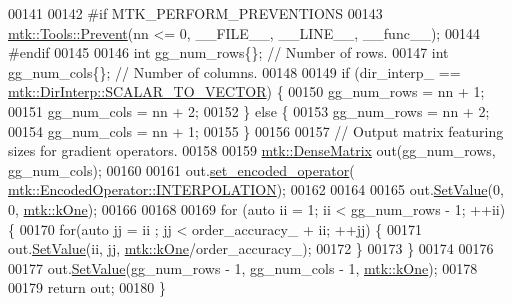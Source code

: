 \begin{DoxyCode}
00141 
00142 \textcolor{preprocessor}{  #if MTK\_PERFORM\_PREVENTIONS}
00143   \hyperlink{classmtk_1_1Tools_a332324c6f25e66be9dff48c5987a3b9f}{mtk::Tools::Prevent}(nn <= 0, \_\_FILE\_\_, \_\_LINE\_\_, \_\_func\_\_);
00144 \textcolor{preprocessor}{  #endif}
00145 
00146   \textcolor{keywordtype}{int} gg\_num\_rows\{\};  \textcolor{comment}{// Number of rows.}
00147   \textcolor{keywordtype}{int} gg\_num\_cols\{\};  \textcolor{comment}{// Number of columns.}
00148 
00149   \textcolor{keywordflow}{if} (dir\_interp\_ == \hyperlink{namespacemtk_ga674ec67bd1baa04e5dc06c2bcc351972a53facfbeb6725b2bd220c8d9811a0673}{mtk::DirInterp::SCALAR\_TO\_VECTOR}) \{
00150     gg\_num\_rows = nn + 1;
00151     gg\_num\_cols = nn + 2;
00152   \} \textcolor{keywordflow}{else} \{
00153     gg\_num\_rows = nn + 2;
00154     gg\_num\_cols = nn + 1;
00155   \}
00156 
00157   \textcolor{comment}{// Output matrix featuring sizes for gradient operators.}
00158 
00159   \hyperlink{classmtk_1_1DenseMatrix}{mtk::DenseMatrix} out(gg\_num\_rows, gg\_num\_cols);
00160 
00161   out.\hyperlink{classmtk_1_1DenseMatrix_ac0f824b0fec88c4fb42e77b7550fb0d3}{set\_encoded\_operator}(
      \hyperlink{namespacemtk_ga9b50023bfb2692219d2915feade94f80a6a9b19b26cdeae14c1102cd40345d568}{mtk::EncodedOperator::INTERPOLATION});
00162 
00164 
00165   out.\hyperlink{classmtk_1_1DenseMatrix_a784ce5784109ac86bfb9d8562b334b13}{SetValue}(0, 0, \hyperlink{group__c01-roots_ga26407c24d43b6b95480943340d285c71}{mtk::kOne});
00166 
00168 
00169   \textcolor{keywordflow}{for} (\textcolor{keyword}{auto} ii = 1; ii < gg\_num\_rows - 1; ++ii) \{
00170     \textcolor{keywordflow}{for}(\textcolor{keyword}{auto} jj = ii ; jj < order\_accuracy\_ + ii; ++jj) \{
00171       out.\hyperlink{classmtk_1_1DenseMatrix_a784ce5784109ac86bfb9d8562b334b13}{SetValue}(ii, jj, \hyperlink{group__c01-roots_ga26407c24d43b6b95480943340d285c71}{mtk::kOne}/order\_accuracy\_);
00172     \}
00173   \}
00174 
00176 
00177   out.\hyperlink{classmtk_1_1DenseMatrix_a784ce5784109ac86bfb9d8562b334b13}{SetValue}(gg\_num\_rows - 1, gg\_num\_cols - 1, \hyperlink{group__c01-roots_ga26407c24d43b6b95480943340d285c71}{mtk::kOne});
00178 
00179   \textcolor{keywordflow}{return} out;
00180 \}
\end{DoxyCode}
